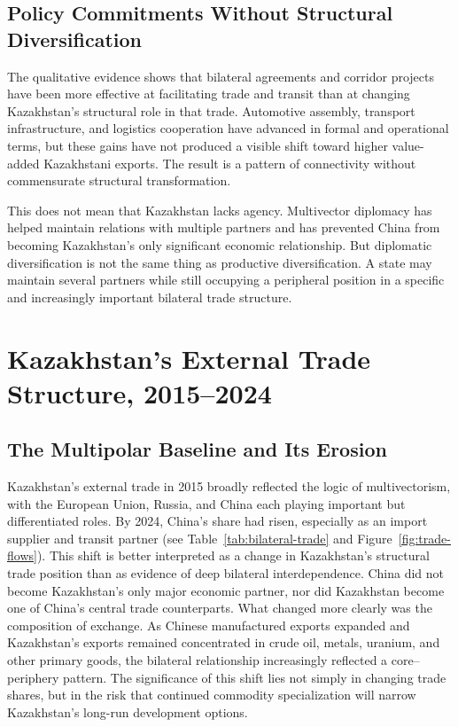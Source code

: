 \documentclass[12pt]{article}
\begin{document}
\subsection{Policy Commitments Without Structural Diversification}

The qualitative evidence shows that bilateral agreements and corridor projects have been more effective at facilitating trade and transit than at changing Kazakhstan's structural role in that trade. Automotive assembly, transport infrastructure, and logistics cooperation have advanced in formal and operational terms, but these gains have not produced a visible shift toward higher value-added Kazakhstani exports. The result is a pattern of connectivity without commensurate structural transformation.

This does not mean that Kazakhstan lacks agency. Multivector diplomacy has helped maintain relations with multiple partners and has prevented China from becoming Kazakhstan's only significant economic relationship. But diplomatic diversification is not the same thing as productive diversification. A state may maintain several partners while still occupying a peripheral position in a specific and increasingly important bilateral trade structure.

\section{Kazakhstan's External Trade Structure, 2015--2024}

\subsection{The Multipolar Baseline and Its Erosion}

Kazakhstan's external trade in 2015 broadly reflected the logic of multivectorism, with the European Union, Russia, and China each playing important but differentiated roles. By 2024, China's share had risen, especially as an import supplier and transit partner (see Table~\ref{tab:bilateral-trade} and Figure~\ref{fig:trade-flows}). This shift is better interpreted as a change in Kazakhstan's structural trade position than as evidence of deep bilateral interdependence. China did not become Kazakhstan's only major economic partner, nor did Kazakhstan become one of China's central trade counterparts. What changed more clearly was the composition of exchange. As Chinese manufactured exports expanded and Kazakhstan's exports remained concentrated in crude oil, metals, uranium, and other primary goods, the bilateral relationship increasingly reflected a core--periphery pattern. The significance of this shift lies not simply in changing trade shares, but in the risk that continued commodity specialization will narrow Kazakhstan's long-run development options.
\end{document}
